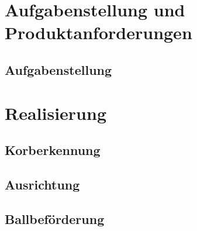 \begin{frame}
    \titlepage
\end{frame}

\setcounter{tocdepth}{1} %
\begin{frame}
    \tableofcontents
\end{frame}

\section{Aufgabenstellung und Produktanforderungen} %
\subsection{Aufgabenstellung}

\section{Realisierung}


%
\subsection{Korberkennung}



\subsection{Ausrichtung}





\subsection{Ballbeförderung}







